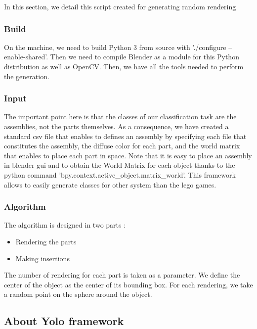 \documentclass[10pt,twocolumn,letterpaper]{article}
\begin{document}
In this section, we detail this script created for generating random rendering 

\subsubsection{Build}

On the machine, we need to build Python 3 from source with './configure --enable-shared'. Then we need 
to compile Blender as a module for this Python distribution as well as OpenCV. Then, we have all the tools 
needed to perform the generation.

\subsubsection{Input}

The important point here is that the classes of our classification task are the assemblies, not the parts 
themselves. As a consequence, we have created a standard csv file that enables to defines an assembly by 
specifying each file that constitutes the assembly, the diffuse color for each part, and the world matrix 
that enables to place each part in space. 
Note that it is easy to place an assembly in blender gui and to obtain the World Matrix for each object 
thanks to the python command 'bpy.context.active\_object.matrix\_world'.
This framework allows to easily generate classes for other system than the lego games.

\subsubsection{Algorithm}

The algorithm is designed in two parts : 
\begin{itemize}
 \item Rendering the parts
 \item Making insertions
\end{itemize}
The number of rendering for each part is taken as a parameter. We define the center of the object as the 
center of its bounding box. For each rendering, we take a random point on the sphere around the object. 


\subsection{About Yolo framework}
\label{subsec:YOLO_subsection}
\end{document}
